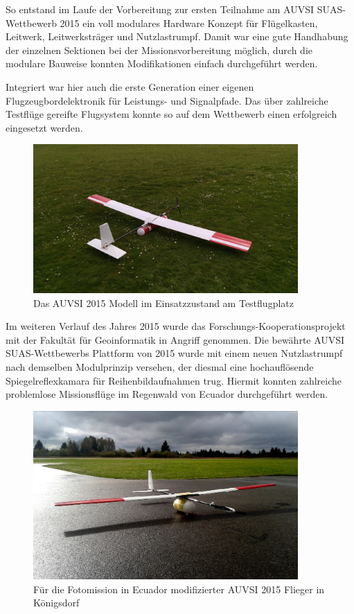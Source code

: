 So entstand im Laufe der Vorbereitung zur ersten Teilnahme am AUVSI SUAS-Wettbewerb 2015 ein voll modulares Hardware Konzept für Flügelkasten, Leitwerk, Leitwerksträger und Nutzlastrumpf. Damit war eine gute Handhabung der einzelnen Sektionen bei der Missionsvorbereitung möglich, durch die modulare Bauweise konnten Modifikationen einfach durchgeführt werden.

Integriert war hier auch die erste Generation einer eigenen Flugzeugbordelektronik für Leistungs- und Signalpfade. Das über zahlreiche Testflüge gereifte Flugsystem konnte so auf dem Wettbewerb einen erfolgreich eingesetzt werden.
\clearpage

\begin{figure}[H]
\centering
\includegraphics[width=0.9\textwidth]{bilder/Fotos/AUVSI_2015.jpg} 
\caption{Das AUVSI 2015 Modell im Einsatzzustand am Testflugplatz} 
\label{Das AUVSI 2015 Modell in Einsatzzustand am Testflugplatz}
\end{figure}

Im weiteren Verlauf des Jahres 2015 wurde das Forschungs-Kooperationsprojekt mit der Fakultät für Geoinformatik in Angriff genommen. Die bewährte AUVSI SUAS-Wettbewerbs Plattform von 2015 wurde mit einem neuen Nutzlastrumpf nach demselben Modulprinzip versehen, der diesmal eine hochauflösende Spiegelreflexkamara für Reihenbildaufnahmen trug. Hiermit konnten zahlreiche problemlose Missionsflüge im Regenwald von Ecuador durchgeführt werden.

\begin{figure}[H]
\centering
\includegraphics[width=0.9\textwidth]{bilder/Fotos/Ecuadorflieger_Koenigsdorf.png} \caption{Für die Fotomission in Ecuador modifizierter AUVSI 2015 Flieger in Königsdorf} 
\label{Für die Fotomission in Ecuador modifizierter AUVSI 2015 Flieger in Königsdorf}
\end{figure}


